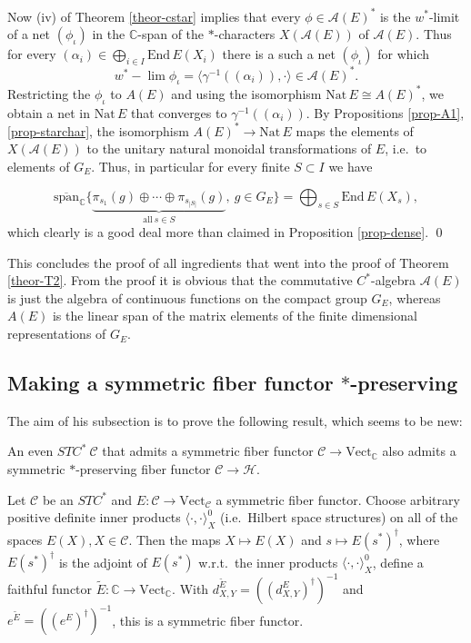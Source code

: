\documentclass[11pt]{article}
\theoremstyle{definition}
\theoremstyle{definition}
\theoremstyle{remark}
\newcommand{\Vect}{\mathrm{Vect}}
\def\2#1{{\mathcal #1}}
\def\7#1{{\mathbb #1}}
\newcommand{\End}{\mathrm{End}}
\newcommand{\rarr}{\rightarrow}
\newcommand{\Nat}{\mathrm{Nat}}
\begin{document}
Now (iv) of Theorem \ref{theor-cstar} implies that every $\phi\in\2A(E)^*$ is the $w^*$-limit of a
net $(\phi_\iota)$ in the $\7C$-span of the $*$-characters $X(\2A(E))$ of $\2A(E)$.  Thus for every 
$(\alpha_i)\in\bigoplus_{i\in I}\End\,E(X_i)$ there is a such a net $(\phi_\iota)$ for which
\[ w^*-\lim \phi_\iota =
\langle\gamma^{-1}((\alpha_i)),\cdot\rangle\in\2A(E)^*. \] Restricting
the $\phi_\iota$ to $A(E)$ and using the isomorphism $\Nat\,E\cong
A(E)^*$, we obtain a net in $\Nat\,E$ that converges to
$\gamma^{-1}((\alpha_i))$. By Propositions \ref{prop-A1},
\ref{prop-starchar}, the isomorphism $A(E)^*\rarr\Nat\,E$ maps the
elements of $X(\2A(E))$ to the unitary natural monoidal
transformations of $E$, i.e.\ to elements of $G_E$.  Thus, in
particular for every finite $S\subset I$ we have

\[ \overline{\mathrm{span}} _{\7C} \{
  \underbrace{ \pi_{s_1}(g)\oplus\cdots\oplus\pi_{s_{|S|}}(g)}_{\mathrm{all}\
    s\in S},\ g\in G_E \}  = \bigoplus_{s\in S}\End\,E(X_s), \]
which clearly is a good deal more than claimed in Proposition
\ref{prop-dense}.  \qed

This concludes the proof of all ingredients that went into the proof
of Theorem \ref{theor-T2}. From the proof it is obvious that the
commutative $C^*$-algebra $\2A(E)$ is just the algebra of continuous
functions on the compact group $G_E$, whereas $A(E)$ is the linear
span of the matrix elements of the finite dimensional representations
of $G_E$.




\subsection{Making a symmetric fiber functor $*$-preserving} \label{ss-starpres}
The aim of his subsection is to prove the following result, which seems to be new:

\btheor \label{theor-F} An even $STC^*\ \2C$ that admits a symmetric
fiber functor $\2C\rarr\Vect_\7C$ also admits a symmetric
$*$-preserving fiber functor $\2C\rarr\2H$.  \etheor

\blemma Let $\2C$ be an $STC^*$ and $E:\2C\rarr\Vect_\2C$ a symmetric
fiber functor. Choose arbitrary positive definite inner products
$\langle\cdot,\cdot\rangle^0_X$ (i.e.\ Hilbert space structures) on
all of the spaces $E(X), X\in\2C$. Then the maps $X\mapsto E(X)$ and
$s\mapsto E(s^*)^\dagger$, where $E(s^*)^\dagger$ is the adjoint of
$E(s^*)$ w.r.t.\ the inner products $\langle\cdot,\cdot\rangle^0_X$,
define a faithful functor $\widetilde{E}:\7C\rarr\Vect_\7C$. With
$d^{\widetilde{E}}_{X,Y}=((d^E_{X,Y})^\dagger)^{-1}$ and
$e^{\widetilde{E}}=((e^E)^\dagger)^{-1}$, this is a symmetric fiber
functor.  \elemma
\end{document}
